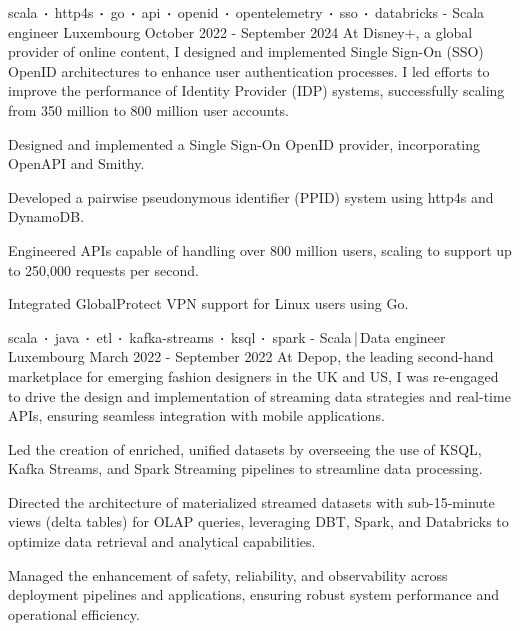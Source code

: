 \begin{cventries}
    \cventry
    {scala$\sqbig$http4s$\sqbig$go$\sqbig$api$\sqbig$openid$\sqbig$opentelemetry$\sqbig$sso$\sqbig$databricks}
    { - Scala engineer}
    {Luxembourg}
    {October 2022 - September 2024}
    {At Disney+, a global provider of online content, I designed and implemented Single Sign-On (SSO) OpenID architectures to enhance user authentication processes. I led efforts to improve the performance of Identity Provider (IDP) systems, successfully scaling from 350 million to 800 million user accounts.}
    {
        \begin{cvitems}
            \item{Designed and implemented a Single Sign-On OpenID provider, incorporating OpenAPI and Smithy.}
            \item{Developed a pairwise pseudonymous identifier (PPID) system using http4s and DynamoDB.}
            \item{Engineered APIs capable of handling over 800 million users, scaling to support up to 250,000 requests per second.}
            \item{Integrated GlobalProtect VPN support for Linux users using Go.}
        \end{cvitems}
    }

    \cventry
    {scala$\sqbig$java$\sqbig$etl$\sqbig$kafka-streams$\sqbig$ksql$\sqbig$spark}
    { - Scala\,|\,Data engineer}
    {Luxembourg}
    {March 2022 - September 2022}
    {At Depop, the leading second-hand marketplace for emerging fashion designers in the UK and US, I was re-engaged to drive the design and implementation of streaming data strategies and real-time APIs, ensuring seamless integration with mobile applications.}
    {
        \begin{cvitems}
            \item{Led the creation of enriched, unified datasets by overseeing the use of KSQL, Kafka Streams, and Spark Streaming pipelines to streamline data processing.}
            \item{Directed the architecture of materialized streamed datasets with sub-15-minute views (delta tables) for OLAP queries, leveraging DBT, Spark, and Databricks to optimize data retrieval and analytical capabilities.}
            \item{Managed the enhancement of safety, reliability, and observability across deployment pipelines and applications, ensuring robust system performance and operational efficiency.}
        \end{cvitems}
    }


\end{cventries}
